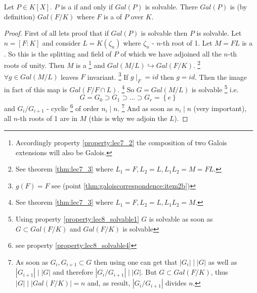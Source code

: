 \begin{theorem}
  Let $P \in K\left[X\right]$. $P$ is a
   if and only if
  $Gal\left(P\right)$ is solvable. There
  $Gal\left(P\right)$ is (by definition) $Gal\left(F/K\right)$ where
  $F$ is a  of $P$ over $K$.
  \label{thm:lec8_1}
  \begin{proof}
    First of all lets proof that if $Gal\left(P\right)$ is solvable
    then $P$ is solvable. Let $n = \left[F:K\right]$ and consider
    $L = K\left(\zeta_n\right)$ where $\zeta_n$ - $n$-th root of 1.
    Let $M = FL$ is a . So this is the
    splitting and field of $P$ of which we have adjoined all the
    $n$-th roots of unity.  Then $M$ is a
    \footnote{
      Accordingly property \ref{property:lec7_2} the composition of
      two Galois extensions will also be Galois.
    }
    and
    $Gal\left(M/L\right) \hookrightarrow Gal\left(F/K\right)$.
    \footnote{
      See theorem \ref{thm:lec7_3} where $L_1 = F, L_2 = L, L_1 L_2 =
      M = FL$.
    }
    $\forall g \in Gal\left(M/L\right)$ leaves $F$ invariant.
    \footnote{
      $g(F) = F$ see  (point
      \ref{thm:galoiscorrespondence:item2b}) 
    }
    If $g\mid_F = id$ then $g = id$. Then the image in fact of this
    map is $Gal\left(F/F \cap L\right)$.
    \footnote{
      See theorem \ref{thm:lec7_3} where $L_1 = F, L_2 = L, L_1 L_2 =
      M$.
    }    
    So $G = Gal\left(M/L\right)$
    is solvable
    \footnote{
      Using property \ref{property:lec8_solvable1} $G$ is solvable as
      soon as $G \subset Gal\left(F/K\right)$ and 
      $Gal\left(F/K\right)$ is solvable
    }
    i.e. 
    \[
    G = G_0 \supset G_1 \supset \dots \supset G_r = \left\{e\right\}
    \]
    and $G_i/G_{i+1}$ - cyclic
    \footnote{
      see property \ref{property:lec8_solvable4}
    }
    of order $n_i \mid n$.
    \footnote{
      As soon as $G_i, G_{i+1} \subset G$ then using
       one can get that
      $\left|G_i\right| \mid \left|G\right|$ as well as
      $\left|G_{i+1}\right| \mid \left|G\right|$ and therefore
      $\left|G_i/G_{i+1}\right| \mid \left|G\right|$. But
      $G \subset Gal\left(F/K\right)$, thus
      $\left|G\right| \mid \left|Gal\left(F/K\right)\right| = n$ and, as
      result, $\left|G_i/G_{i+1}\right|$ divides $n$.
    }
    And as soon as
    $n_i \mid n$ (very important), all $n$-th roots of 1 are in $M$
    (this is why we adjoin the $L$).


\end{proof}
\end{theorem}
